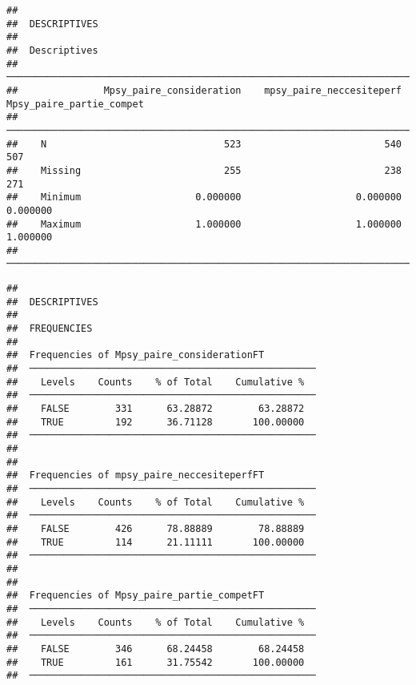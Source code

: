 \documentclass[
]{article}
\begin{document}
\begin{verbatim}
## 
##  DESCRIPTIVES
## 
##  Descriptives                                                                                    
##  ─────────────────────────────────────────────────────────────────────────────────────────────── 
##               Mpsy_paire_consideration    mpsy_paire_neccesiteperf    Mpsy_paire_partie_compet   
##  ─────────────────────────────────────────────────────────────────────────────────────────────── 
##    N                               523                         540                         507   
##    Missing                         255                         238                         271   
##    Minimum                    0.000000                    0.000000                    0.000000   
##    Maximum                    1.000000                    1.000000                    1.000000   
##  ───────────────────────────────────────────────────────────────────────────────────────────────
\end{verbatim}

\begin{verbatim}
## 
##  DESCRIPTIVES
## 
##  FREQUENCIES
## 
##  Frequencies of Mpsy_paire_considerationFT          
##  ────────────────────────────────────────────────── 
##    Levels    Counts    % of Total    Cumulative %   
##  ────────────────────────────────────────────────── 
##    FALSE        331      63.28872        63.28872   
##    TRUE         192      36.71128       100.00000   
##  ────────────────────────────────────────────────── 
## 
## 
##  Frequencies of mpsy_paire_neccesiteperfFT          
##  ────────────────────────────────────────────────── 
##    Levels    Counts    % of Total    Cumulative %   
##  ────────────────────────────────────────────────── 
##    FALSE        426      78.88889        78.88889   
##    TRUE         114      21.11111       100.00000   
##  ────────────────────────────────────────────────── 
## 
## 
##  Frequencies of Mpsy_paire_partie_competFT          
##  ────────────────────────────────────────────────── 
##    Levels    Counts    % of Total    Cumulative %   
##  ────────────────────────────────────────────────── 
##    FALSE        346      68.24458        68.24458   
##    TRUE         161      31.75542       100.00000   
##  ──────────────────────────────────────────────────
\end{verbatim}
\end{document}
